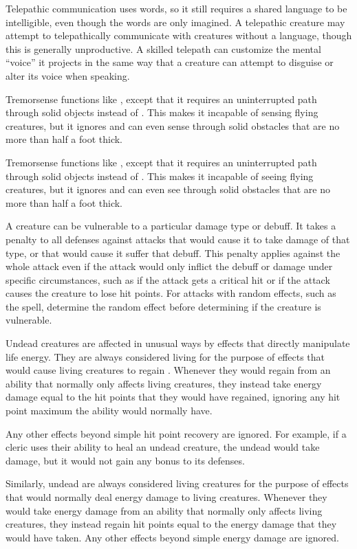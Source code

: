         Telepathic communication uses words, so it still requires a shared language to be intelligible, even though the words are only imagined.
        A telepathic creature may attempt to telepathically communicate with creatures without a language, though this is generally unproductive.
        A skilled telepath can customize the mental ``voice'' it projects in the same way that a creature can attempt to disguise or alter its voice when speaking.

        Tremorsense functions like , except that it requires an uninterrupted path through solid objects instead of .
        This makes it incapable of sensing flying creatures, but it ignores  and can even sense through solid obstacles that are no more than half a foot thick.

        Tremorsense functions like , except that it requires an uninterrupted path through solid objects instead of .
        This makes it incapable of seeing flying creatures, but it ignores  and can even see through solid obstacles that are no more than half a foot thick.

        A creature can be vulnerable to a particular damage type or debuff.
        It takes a  penalty to all defenses against attacks that would cause it to take damage of that type, or that would cause it suffer that debuff.
        This penalty applies against the whole attack even if the attack would only inflict the debuff or damage under specific circumstances, such as if the attack gets a critical hit or if the attack causes the creature to lose hit points.
        For attacks with random effects, such as the  spell, determine the random effect before determining if the creature is vulnerable.

        Undead creatures are affected in unusual ways by effects that directly manipulate life energy.
        They are always considered living  for the purpose of effects that would cause living creatures to regain .
        Whenever they would regain  from an ability that normally only affects living creatures, they instead take energy damage equal to the hit points that they would have regained, ignoring any hit point maximum the ability would normally have.

        Any other effects beyond simple hit point recovery are ignored.
        For example, if a cleric uses their  ability to heal an undead creature, the undead would take damage, but it would not gain any bonus to its defenses.

        Similarly, undead are always considered living creatures for the purpose of effects that would normally deal energy damage to living creatures.
        Whenever they would take energy damage from an ability that normally only affects living creatures, they instead regain hit points equal to the energy damage that they would have taken. 
        Any other effects beyond simple energy damage are ignored.
